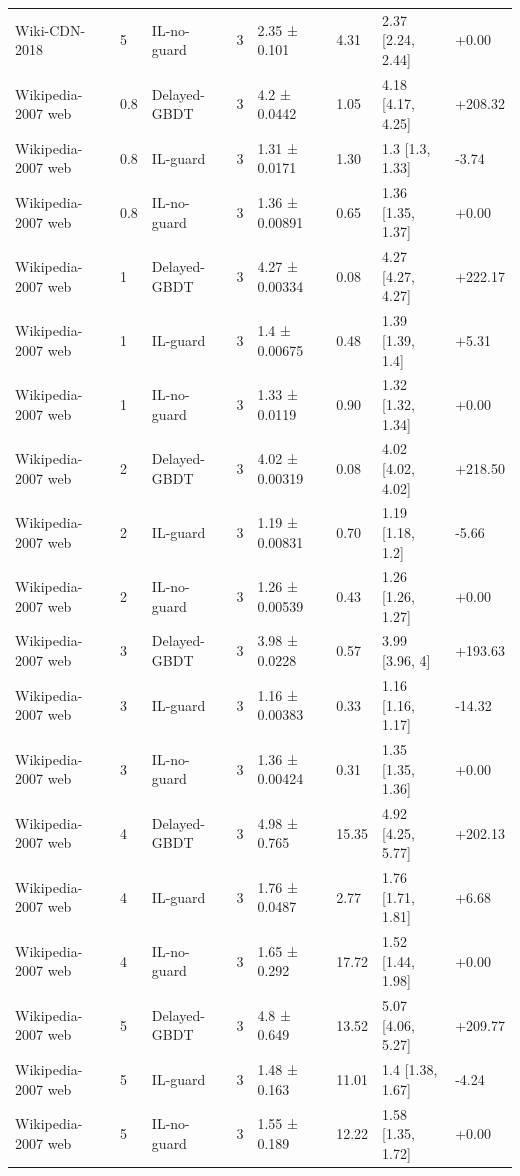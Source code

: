 \begin{table}[t]
\begin{tabular}{llllllll}
Wiki-CDN-2018 & 5 & IL-no-guard & 3 & 2.35 ± 0.101 & 4.31 & 2.37 [2.24, 2.44] & +0.00 \\
Wikipedia-2007 web & 0.8 & Delayed-GBDT & 3 & 4.2 ± 0.0442 & 1.05 & 4.18 [4.17, 4.25] & +208.32 \\
Wikipedia-2007 web & 0.8 & IL-guard & 3 & 1.31 ± 0.0171 & 1.30 & 1.3 [1.3, 1.33] & -3.74 \\
Wikipedia-2007 web & 0.8 & IL-no-guard & 3 & 1.36 ± 0.00891 & 0.65 & 1.36 [1.35, 1.37] & +0.00 \\
Wikipedia-2007 web & 1 & Delayed-GBDT & 3 & 4.27 ± 0.00334 & 0.08 & 4.27 [4.27, 4.27] & +222.17 \\
Wikipedia-2007 web & 1 & IL-guard & 3 & 1.4 ± 0.00675 & 0.48 & 1.39 [1.39, 1.4] & +5.31 \\
Wikipedia-2007 web & 1 & IL-no-guard & 3 & 1.33 ± 0.0119 & 0.90 & 1.32 [1.32, 1.34] & +0.00 \\
Wikipedia-2007 web & 2 & Delayed-GBDT & 3 & 4.02 ± 0.00319 & 0.08 & 4.02 [4.02, 4.02] & +218.50 \\
Wikipedia-2007 web & 2 & IL-guard & 3 & 1.19 ± 0.00831 & 0.70 & 1.19 [1.18, 1.2] & -5.66 \\
Wikipedia-2007 web & 2 & IL-no-guard & 3 & 1.26 ± 0.00539 & 0.43 & 1.26 [1.26, 1.27] & +0.00 \\
Wikipedia-2007 web & 3 & Delayed-GBDT & 3 & 3.98 ± 0.0228 & 0.57 & 3.99 [3.96, 4] & +193.63 \\
Wikipedia-2007 web & 3 & IL-guard & 3 & 1.16 ± 0.00383 & 0.33 & 1.16 [1.16, 1.17] & -14.32 \\
Wikipedia-2007 web & 3 & IL-no-guard & 3 & 1.36 ± 0.00424 & 0.31 & 1.35 [1.35, 1.36] & +0.00 \\
Wikipedia-2007 web & 4 & Delayed-GBDT & 3 & 4.98 ± 0.765 & 15.35 & 4.92 [4.25, 5.77] & +202.13 \\
Wikipedia-2007 web & 4 & IL-guard & 3 & 1.76 ± 0.0487 & 2.77 & 1.76 [1.71, 1.81] & +6.68 \\
Wikipedia-2007 web & 4 & IL-no-guard & 3 & 1.65 ± 0.292 & 17.72 & 1.52 [1.44, 1.98] & +0.00 \\
Wikipedia-2007 web & 5 & Delayed-GBDT & 3 & 4.8 ± 0.649 & 13.52 & 5.07 [4.06, 5.27] & +209.77 \\
Wikipedia-2007 web & 5 & IL-guard & 3 & 1.48 ± 0.163 & 11.01 & 1.4 [1.38, 1.67] & -4.24 \\
Wikipedia-2007 web & 5 & IL-no-guard & 3 & 1.55 ± 0.189 & 12.22 & 1.58 [1.35, 1.72] & +0.00 \\
\bottomrule
\end{tabular}
\end{table}
